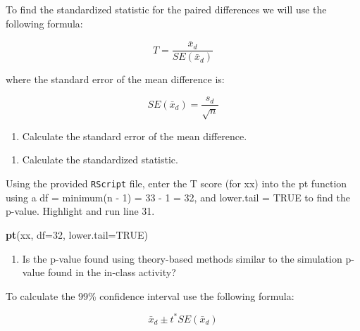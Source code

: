 \documentclass[
]{report}
\newenvironment{Shaded}{\begin{snugshade}}{\end{snugshade}}
\newcommand{\DataTypeTok}[1]{\textcolor[rgb]{0.13,0.29,0.53}{#1}}
\newcommand{\DecValTok}[1]{\textcolor[rgb]{0.00,0.00,0.81}{#1}}
\newcommand{\KeywordTok}[1]{\textcolor[rgb]{0.13,0.29,0.53}{\textbf{#1}}}
\newcommand{\NormalTok}[1]{#1}
\newcommand{\OtherTok}[1]{\textcolor[rgb]{0.56,0.35,0.01}{#1}}
\providecommand{\tightlist}{%
  \setlength{\itemsep}{0pt}\setlength{\parskip}{0pt}}
\begin{document}
\vspace{1in}

To find the standardized statistic for the paired differences we will use the following formula:

\[T = \frac{\bar{x}_d}{SE(\bar{x}_d)}\]

where the standard error of the mean difference is:

\[SE(\bar{x}_d)=\frac{s_d}{\sqrt{n}}\]

\begin{enumerate}
\def\labelenumi{\arabic{enumi}.}
\setcounter{enumi}{1}
\tightlist
\item
  Calculate the standard error of the mean difference.
\end{enumerate}

\vspace{0.5in}

\begin{enumerate}
\def\labelenumi{\arabic{enumi}.}
\setcounter{enumi}{2}
\tightlist
\item
  Calculate the standardized statistic.
\end{enumerate}

\vspace{0.5in}

Using the provided \texttt{RScript} file, enter the T score (for xx) into the pt function using a df = minimum(n - 1) = 33 - 1 = 32, and lower.tail = TRUE to find the p-value. Highlight and run line 31.

\begin{Shaded}
\begin{Highlighting}[]
\KeywordTok{pt}\NormalTok{(xx, }\DataTypeTok{df=}\DecValTok{32}\NormalTok{, }\DataTypeTok{lower.tail=}\OtherTok{TRUE}\NormalTok{)}
\end{Highlighting}
\end{Shaded}

\begin{enumerate}
\def\labelenumi{\arabic{enumi}.}
\setcounter{enumi}{3}
\tightlist
\item
  Is the p-value found using theory-based methods similar to the simulation p-value found in the in-class activity?
\end{enumerate}

\vspace{0.5in}

To calculate the 99\% confidence interval use the following formula:

\[\bar{x}_d\pm t^* SE(\bar{x}_d)\]
\end{document}
